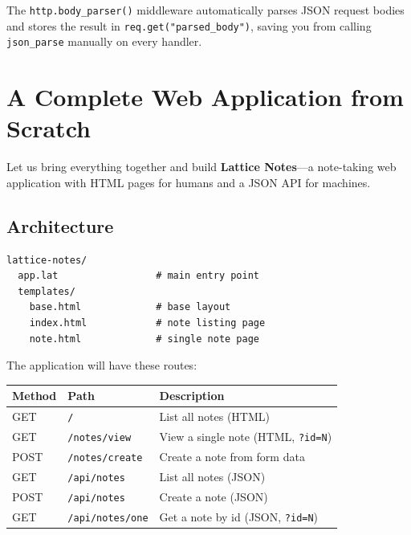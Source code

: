 The \lstinline|http.body_parser()| middleware automatically parses JSON request bodies and stores the result in \lstinline|req.get("parsed_body")|, saving you from calling \lstinline|json_parse| manually on every handler.

\section{A Complete Web Application from Scratch}\label{sec:complete-web-app}


Let us bring everything together and build \textbf{Lattice Notes}---a note-taking web application with HTML pages for humans and a JSON API for machines.

\subsection{Architecture}\label{sec:webapp-architecture}

\begin{lstlisting}[language={}, caption={Project structure}]
lattice-notes/
  app.lat                 # main entry point
  templates/
    base.html             # base layout
    index.html            # note listing page
    note.html             # single note page
\end{lstlisting}

The application will have these routes:

\begin{center}
\begin{tabular}{llp{6cm}}
\toprule
\textbf{Method} & \textbf{Path} & \textbf{Description} \\
\midrule
GET  & \texttt{/}               & List all notes (HTML) \\
GET  & \texttt{/notes/view}     & View a single note (HTML, \texttt{?id=N}) \\
POST & \texttt{/notes/create}   & Create a note from form data \\
GET  & \texttt{/api/notes}      & List all notes (JSON) \\
POST & \texttt{/api/notes}      & Create a note (JSON) \\
GET  & \texttt{/api/notes/one}  & Get a note by id (JSON, \texttt{?id=N}) \\
\bottomrule
\end{tabular}
\end{center}

